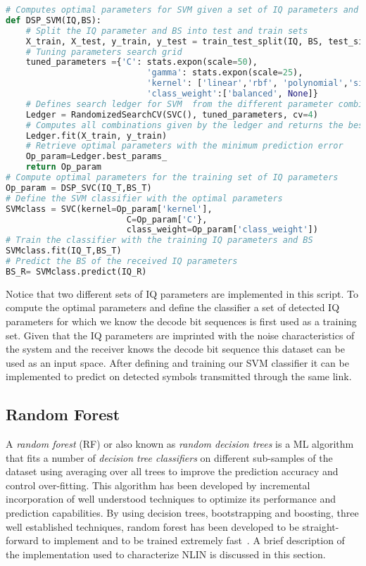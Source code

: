 \begin{lstlisting}[language=Python, caption=SVM implementation in python where the optimal parameter are determined form a training dataset. With the optimal parameters the scheme can classify a new set of IQ parameters and determine the decode bit sequence.]
# Computes optimal parameters for SVM given a set of IQ parameters and the decoded bit sequence(BS)
def DSP_SVM(IQ,BS):
	# Split the IQ parameter and BS into test and train sets
    X_train, X_test, y_train, y_test = train_test_split(IQ, BS, test_size = 0.20)
	# Tuning parameters search grid  
	tuned_parameters ={'C': stats.expon(scale=50),
							'gamma': stats.expon(scale=25),
							'kernel': ['linear','rbf', 'polynomial','sigmoid'],
							'class_weight':['balanced', None]}
	# Defines search ledger for SVM  from the different parameter combinations 
    Ledger = RandomizedSearchCV(SVC(), tuned_parameters, cv=4)
	# Computes all combinations given by the ledger and returns the best performing parameters
    Ledger.fit(X_train, y_train)
	# Retrieve optimal parameters with the minimum prediction error 
    Op_param=Ledger.best_params_
    return Op_param
# Compute optimal parameters for the training set of IQ parameters
Op_param = DSP_SVC(IQ_T,BS_T)
# Define the SVM classifier with the optimal parameters
SVMclass = SVC(kernel=Op_param['kernel'],
    					C=Op_param['C'},
    					class_weight=Op_param['class_weight'])
# Train the classifier with the training IQ parameters and BS      
SVMclass.fit(IQ_T,BS_T)
# Predict the BS of the received IQ parameters
BS_R= SVMclass.predict(IQ_R)
\end{lstlisting}
 Notice that two different sets of IQ parameters are implemented in this script. To compute the optimal parameters and define the classifier a set of detected IQ parameters for which we know the decode bit sequences is first used as a training set. Given that the IQ parameters are imprinted with the noise  characteristics of the system and the receiver knows the decode bit sequence this dataset can be used as an input space. After defining and training our SVM classifier it can be implemented to predict on detected symbols transmitted through the same link. 
\subsection{Random Forest}

A \textit{random forest} (RF) or also known as \textit{random decision trees} is a ML algorithm that fits a number of \textit{decision tree classifiers} on different sub-samples of the dataset using averaging over all trees to improve the prediction accuracy and control over-fitting. This algorithm has been developed by incremental incorporation of well understood techniques to optimize its performance and prediction capabilities. By using decision trees, bootstrapping and boosting, three well established techniques, random forest has been developed to be straight-forward to implement and to be trained extremely fast~\cite{ho1995random}. A brief description of the implementation used to characterize NLIN is discussed in this section.
 
